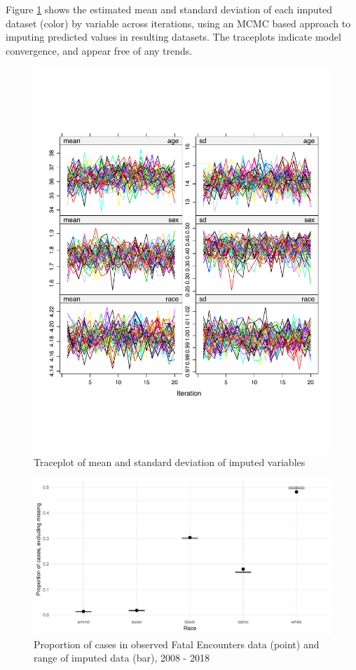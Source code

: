 \documentclass{article}
\begin{document}
Figure \ref{fig:traceplot} shows the estimated mean and standard deviation of each imputed dataset (color) by variable across iterations, using an MCMC based approach to imputing predicted values in resulting datasets. The traceplots indicate model convergence, and appear free of any trends. 

\begin{figure}
	\centering
	\includegraphics[width = \linewidth]{vis/imp_trace_1.pdf}
	\caption{Traceplot of mean and standard deviation of imputed variables}
	\label{fig:traceplot}
\end{figure}

\begin{figure}
	\centering
	\includegraphics[width = \linewidth]{vis/race_impute_pct.pdf}
	\caption{Proportion of cases in observed Fatal Encounters data (point) and range of imputed data (bar), 2008 - 2018}
	\label{fig:race_impute_pct}
\end{figure}
\end{document}
